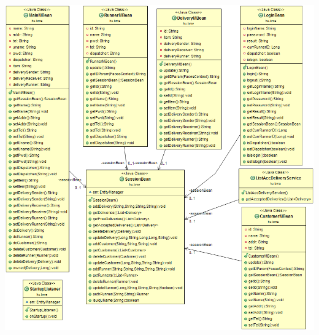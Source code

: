 \documentclass[a4paper,oneside,12pt]{article}
\begin{document}
\newpage
\begin{center}
	\includegraphics[width=14cm]{bbeans.png}
\end{center}
\end{document}
